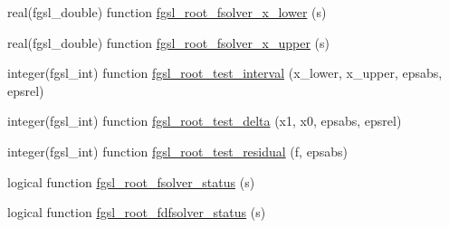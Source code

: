 \begin{DoxyCompactItemize}
\item 
real(fgsl\-\_\-double) function \hyperlink{roots_8finc_a50e5822efb5024274b19e437e33776b2}{fgsl\-\_\-root\-\_\-fsolver\-\_\-x\-\_\-lower} (s)
\item 
real(fgsl\-\_\-double) function \hyperlink{roots_8finc_a5eab10a10072a9ca636cad6c7ffcad10}{fgsl\-\_\-root\-\_\-fsolver\-\_\-x\-\_\-upper} (s)
\item 
integer(fgsl\-\_\-int) function \hyperlink{roots_8finc_a156ed7fa6e25c07decded2880ee5c9e6}{fgsl\-\_\-root\-\_\-test\-\_\-interval} (x\-\_\-lower, x\-\_\-upper, epsabs, epsrel)
\item 
integer(fgsl\-\_\-int) function \hyperlink{roots_8finc_a397c00c2706cec9e7774bab00e9d3488}{fgsl\-\_\-root\-\_\-test\-\_\-delta} (x1, x0, epsabs, epsrel)
\item 
integer(fgsl\-\_\-int) function \hyperlink{roots_8finc_af9ecc6e6a7c09d84fb5548c8eea95035}{fgsl\-\_\-root\-\_\-test\-\_\-residual} (f, epsabs)
\item 
logical function \hyperlink{roots_8finc_ab11a61f02e9c07f0ba691967526370ff}{fgsl\-\_\-root\-\_\-fsolver\-\_\-status} (s)
\item 
logical function \hyperlink{roots_8finc_a11b750f9689b4905ab50f323d3d7cfd5}{fgsl\-\_\-root\-\_\-fdfsolver\-\_\-status} (s)
\end{DoxyCompactItemize}


